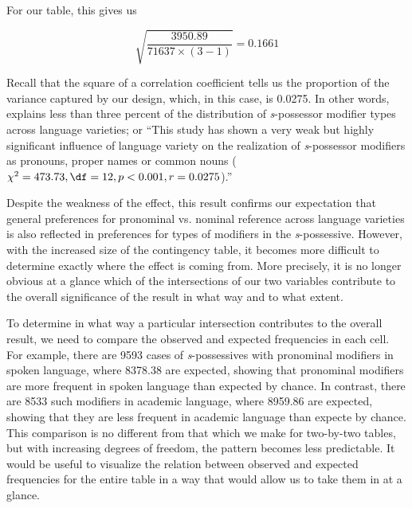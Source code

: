 For our table, this gives us

\[\sqrt{\frac{3950.89}{71637 \times (3-1)}} = 0.1661\] %

Recall that the square of a correlation  coefficient tells us the proportion of the variance  captured by our design,  which, in this case, is 0.0275. In other words,   explains less than three percent of the distribution  of \textit{s}-possessor modifier types across language varieties;  or ``This study has shown a very weak but highly significant  influence of language variety on the realization of \textit{s}-possessor modifiers as pronouns,  proper names or common nouns  ($\chi^2 = 473.73, \df = 12, p < 0.001, r = 0.0275$).''

Despite the weakness of the effect, this result confirms our expectation that general preferences for pronominal  vs. nominal  reference across language varieties  is also reflected in preferences for types of modifiers in the \textit{s}-possessive.  However, with the increased size of the contingency  table, it becomes more difficult to determine exactly where the effect is coming from. More precisely, it is no longer obvious at a glance which of the intersections of our two variables contribute to the overall significance  of the result in what way and to what extent.

To determine in what way a particular intersection contributes to the overall result, we need to compare the observed and expected  frequencies in each cell. For example, there are 9593 cases of \textit{s}-possessives  with pronominal modifiers in spoken  language, where 8378.38 are expected, showing that pronominal  modifiers are more frequent in spoken language than expected by chance.  In contrast, there are 8533 such modifiers in academic  language, where 8959.86 are expected, showing that they are less frequent in academic language than expecte by chance. This comparison is no different from that which we make for two\hyp{}by\hyp{}two tables, but with increasing degrees of freedom, the pattern becomes less predictable. It would be useful to visualize the relation between observed and expected  frequencies for the entire table in a way that would allow us to take them in at a glance.


